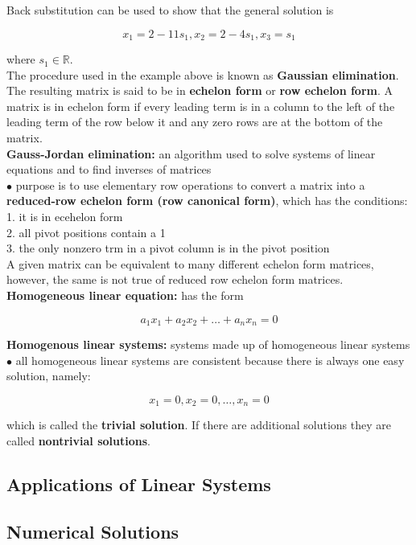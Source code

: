         Back substitution can be used to show that the general solution is

        \[
            x_1 = 2-11s_1, x_2 = 2-4s_1, x_3 = s_1
        \]

        where $s_1\in \mathbb{R}$. \\

        The procedure used in the example above is known as \textbf{Gaussian elimination}. The resulting matrix is said to be in \textbf{echelon form} or \textbf{row echelon form}. A matrix is in echelon form if every
        leading term is in a column to the left of the leading term of the row below it and any zero rows are at the bottom of the matrix. \\

        \textbf{Gauss-Jordan elimination:} an algorithm used to solve systems of linear equations and to find inverses of matrices \\
        $\bullet$ purpose is to use elementary row operations to convert a matrix into a \textbf{reduced-row echelon form (row canonical form)}, which has the conditions: \\
        1. it is in ecehelon form \\
        2. all pivot positions contain a 1 \\
        3. the only nonzero trm in a pivot column is in the pivot position \\

        A given matrix can be equivalent to many different echelon form matrices, however, the same is not true of reduced row echelon form matrices. \\

        \textbf{Homogeneous linear equation:} has the form

        \[
            a_1 x_1 + a_2 x_2 + \dots + a_n x_n = 0
        \]

        \textbf{Homogenous linear systems:} systems made up of homogeneous linear systems \\
        $\bullet$ all homogeneous linear systems are consistent because there is always one easy solution, namely:

        \[
            x_1 = 0, x_2 = 0, \dots, x_n = 0
        \]

        which is called the \textbf{trivial solution}. If there are additional solutions they are called \textbf{nontrivial solutions}.

    \subsection{Applications of Linear Systems} %
    \subsection{Numerical Solutions}            %